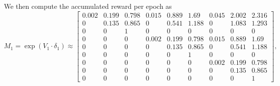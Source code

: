 \documentclass[hidelinks,11pt]{article}
\begin{document}
    We then compute the accumulated reward per epoch as
    \begin{equation*}
        M_1 = \exp(V_1 \cdot \delta_1) \approx
        \left [
            \begin{array}{ccc|ccc|ccc}
                0.002 & 0.199 & 0.798 & 0.015 & 0.889 & 1.69  & 0.045 & 2.002 & 2.316 \\
                0     & 0.135 & 0.865 & 0     & 0.541 & 1.188 & 0     & 1.083 & 1.293 \\
                0     & 0     & 1     & 0     & 0     & 0     & 0     & 0     & 0     \\
                \hline
                0     & 0     & 0     & 0.002 & 0.199 & 0.798 & 0.015 & 0.889 & 1.69  \\
                0     & 0     & 0     & 0     & 0.135 & 0.865 & 0     & 0.541 & 1.188 \\
                0     & 0     & 0     & 0     & 0     & 1     & 0     & 0     & 0     \\
                \hline
                0     & 0     & 0     & 0     & 0     & 0     & 0.002 & 0.199 & 0.798 \\
                0     & 0     & 0     & 0     & 0     & 0     & 0     & 0.135 & 0.865 \\
                0     & 0     & 0     & 0     & 0     & 0     & 0     & 0     & 1
            \end{array}
            \right ],
    \end{equation*}
\end{document}
